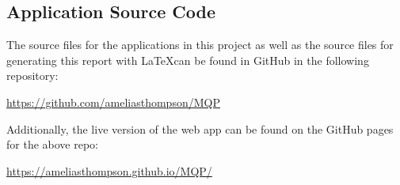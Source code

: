 \documentclass[12pt]{report}
\begin{document}



%

\begin{appendices}

\chapter{Application Source Code}
\label{ch:App Source Code}

The source files for the applications in this project as well as the source files for generating this report with \LaTeX can be found in GitHub in the following repository:

\noindent\url{https://github.com/ameliasthompson/MQP}

\noindent Additionally, the live version of the web app can be found on the GitHub pages for the above repo:

\noindent\url{https://ameliasthompson.github.io/MQP/}

\end{appendices}
\end{document}
